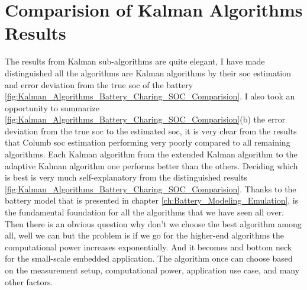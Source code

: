 \section{Comparision of Kalman Algorithms Results}
The results from Kalman sub-algorithms are quite elegant, I have made distinguished all the algorithms are Kalman algorithms by their soc estimation and error deviation from the true soc of the battery \ref{fig:Kalman_Algorithms_Battery_Charing_SOC_Comparision}.
I also took an opportunity to summarize \ref{fig:Kalman_Algorithms_Battery_Charing_SOC_Comparision}(b) the error deviation from the true soc to the estimated soc, it is very clear from the results that Columb soc estimation performing very poorly compared to all remaining algorithms. Each Kalman algorithm from the extended Kalman algorithm to the adaptive Kalman algorithm one performs better than the others. Deciding which is best is very much self-explanatory from the distinguished results \ref{fig:Kalman_Algorithms_Battery_Charing_SOC_Comparision}. Thanks to the battery model that is presented in  
chapter \ref{ch:Battery_Modeling_Emulation}, is the fundamental foundation for all the algorithms that we have seen all over. Then there is an obvious question why don't we choose the best algorithm among all, well we can but the problem is if we go for the higher-end algorithms the computational power increases exponentially. And it becomes and bottom neck for the small-scale embedded application. The algorithm once can choose based on the measurement setup, computational power, application use case, and many other factors.
